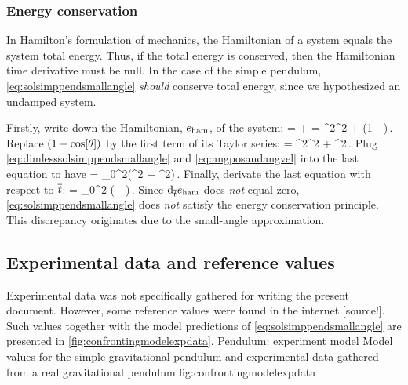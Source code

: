 \subsubsection{Energy conservation}
In Hamilton's formulation of mechanics, the Hamiltonian of a system equals the system total energy. Thus, if the total energy is conserved, then the Hamiltonian time derivative must be null. In the case of the simple pendulum, \cref{eq:solsimppendsmallangle} \emph{should} conserve total energy, since we hypothesized an undamped system.

Firstly, write down the Hamiltonian, $e_\text{ham}$, of the system:
\beq
\ham = \ken + \pen 
     = \mass\length^2\angvel^2 + \mass\grav\length\left(1 - \cos\vat{\angpos}\right)\,. 
\eeq
Replace $\left(1 - \cos\!\left[{\theta}\right]\right)$ by the first term of its Taylor series:
\ham = \mass\length^2\angvel^2 + \mass\grav\length\angpos^2\,. 
\eeq
Plug \cref{eq:dimlesssolsimppendsmallangle} and \cref{eq:angposandangvel} into the last equation to have
\ham = \mass\length\angpos_0^2\left(\length\sin^2 + \grav\cos^2\right)\,.
\eeq
Finally, derivate the last equation with respect to $\overline{t}$:
\beq
{}\ham = \mass\length\angpos_0^2
                     \left( 
                         \length\sin{}\cos{} 
                         - \grav\sin{}\cos{}
                     \right)\,.
\eeq
Since $\text{d}_{\overline{t}}e_\text{ham}$ does \emph{not} equal zero, \cref{eq:solsimppendsmallangle} does \emph{not} satisfy the energy conservation principle. This discrepancy originates due to the small-angle approximation.


\subsection{Experimental data and reference values}
Experimental data was not specifically gathered for writing the present document. However, some reference values were found in the internet [source!]. Such values together with the model predictions of \cref{eq:solsimppendsmallangle} are presented in \cref{fig:confrontingmodelexpdata}.
%
   {Pendulum: experiment \vs model}
   {Model values for the simple gravitational pendulum and experimental data gathered from a real gravitational pendulum}%
   {fig:confrontingmodelexpdata}%

